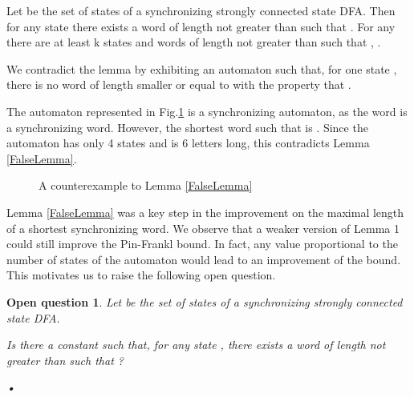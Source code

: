 \documentclass{llncs}
\newenvironment{counterex}[1][Counterexample]{\begin{trivlist}
\item[\hskip \labelsep {\bfseries #1}]}{\end{trivlist}}
\newtheorem*{Openquest}{Open question}
\begin{document}
\begin{lemma}
\label{FalseLemma}
Let  be the set of states of a synchronizing strongly connected state DFA. Then for any state  there exists a word  of length not greater than  such that . For any  there are at least k states  and words  of length not greater than  such that , .
\end{lemma}

We contradict the lemma by exhibiting an automaton such that, for one state , there is no word  of length smaller or equal to  with the property that .

\begin{counterex}

The automaton represented in Fig.\ref{Counter} is a synchronizing automaton, as the word  is a synchronizing word. However, the shortest word  such that  is . Since the automaton has only 4 states and  is 6 letters long, this contradicts Lemma \ref{FalseLemma}.

\begin{figure}[h!]
\begin{center}
\end{center}
\caption{A counterexample to Lemma \ref{FalseLemma}}
\label{Counter}
\end{figure}

\end{counterex}

Lemma \ref{FalseLemma} was a key step in the improvement on the maximal length of a shortest synchronizing word. We observe that a weaker version of Lemma 1 could still improve the Pin-Frankl bound. In fact, any value proportional to the number of states of the automaton would lead to an improvement of the bound. This motivates us to raise the following open question.

\begin{Openquest}
Let  be the set of states of a synchronizing strongly connected state DFA.

Is there a constant  such that, for any state , there exists a word  of length not greater than  such that ?
\end{Openquest}






\textit{•}
\end{document}
